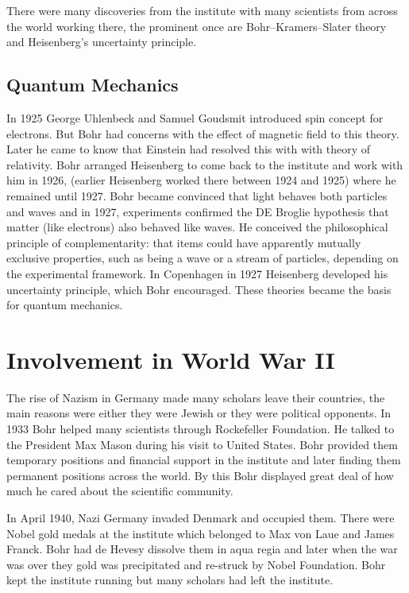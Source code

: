 \documentclass[11pt, article]{scrartcl}
\begin{document}
	There were many discoveries from the institute with many scientists from across the world working there, the prominent once are Bohr–Kramers–Slater theory and Heisenberg's uncertainty principle.

\subsection {Quantum Mechanics}
	In 1925 George Uhlenbeck and Samuel Goudsmit introduced spin concept for electrons. But Bohr had concerns with the effect of magnetic field to
	this theory. Later he came to know that Einstein had resolved this with with theory of relativity. Bohr arranged Heisenberg to come back to
	the institute and work with him in 1926, (earlier Heisenberg worked there between 1924 and 1925) where he remained until 1927. Bohr became
	convinced that light behaves both particles and waves  and in 1927, experiments confirmed the DE Broglie hypothesis that matter (like
	electrons) also behaved like waves. He conceived the philosophical principle of complementarity: that items could have apparently mutually exclusive properties, 
	such as being a wave or a stream of particles, depending on the experimental framework. In Copenhagen in 1927 Heisenberg developed his uncertainty principle, 
	which Bohr encouraged. These theories became the basis for quantum mechanics.  

\section{Involvement in World War II} %
	The rise of Nazism in Germany made many scholars leave their countries, the main reasons were either they were Jewish or they were political
	opponents. In 1933 Bohr helped many scientists through Rockefeller Foundation. He talked to the President Max Mason during his visit to United
	States. Bohr provided them temporary positions and financial support in the institute and later finding them permanent positions across the world. 
	By this Bohr displayed great deal of how much he cared about the scientific community. 

	In April 1940, Nazi Germany invaded Denmark and occupied them. There were Nobel gold medals at the institute which belonged to Max von Laue
	and James Franck. Bohr had de Hevesy dissolve them in aqua regia and later when the war was over they gold was precipitated and re-struck by
	Nobel Foundation. Bohr kept the institute running but many scholars had left the institute.
\end{document}
